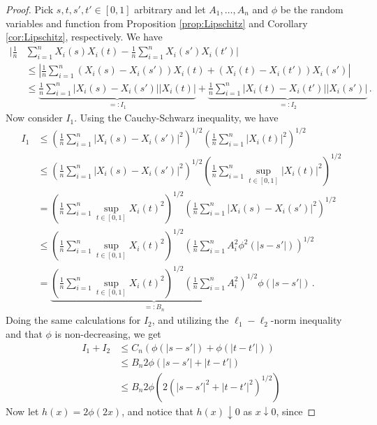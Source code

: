 \begin{proof}
    Pick $s, t, s', t' \in [0, 1]$ arbitrary and let $A_1, \dots, A_n$ and $\phi$ be the random
    variables and function from Proposition \ref{prop:Lipschitz} and Corollary \ref{cor:Lipschitz},
    respectively. We have
    \begin{align}
        |\frac{1}{n} &\sum_{i = 1}^n X_i(s) X_i(t) - \frac{1}{n} \sum_{i = 1}^n X_i(s') X_i(t')| \\
        &\leq |\frac{1}{n} \sum_{i = 1}^n (X_i(s) - X_i(s')) X_i(t) + (X_i(t) - X_i(t')) X_i(s')| \\
        &\leq \underbrace{\frac{1}{n} \sum_{i = 1}^n |X_i(s) - X_i(s')| |X_i(t)|}_{=:I_1} +
        \underbrace{\frac{1}{n} \sum_{i = 1}^n |X_i(t) - X_i(t')| |X_i(s')|}_{=:I_2} \,.
    \end{align}
    Now consider $I_1$. Using the Cauchy-Schwarz inequality, we have
    \begin{align}
        I_1 &\leq \left(\frac{1}{n} \sum_{i = 1}^n |X_i(s) - X_i(s')|^2\right)^{1/2}
        \left(\frac{1}{n} \sum_{i = 1}^n |X_i(t)|^2\right)^{1/2} \\
        &\leq \left(\frac{1}{n} \sum_{i = 1}^n |X_i(s) - X_i(s')|^2\right)^{1/2} \left(\frac{1}{n}
        \sum_{i = 1}^n \sup_{t \in [0, 1]} |X_i(t)|^2\right)^{1/2} \\
        &= \left(\frac{1}{n} \sum_{i = 1}^n \sup_{t \in [0, 1]} X_i(t)^2\right)^{1/2}
        \left(\frac{1}{n}\sum_{i = 1}^n |X_i(s) - X_i(s')|^2\right)^{1/2} \\
        &\leq \left(\frac{1}{n} \sum_{i = 1}^n \sup_{t \in [0, 1]} X_i(t)^2\right)^{1/2}
        \left(\frac{1}{n}\sum_{i = 1}^n A_i^2 \phi^2(|s - s'|)\right)^{1/2} \\
        &= \underbrace{\left(\frac{1}{n} \sum_{i = 1}^n \sup_{t \in [0, 1]} X_i(t)^2\right)^{1/2}
        \left(\frac{1}{n}\sum_{i = 1}^n A_i^2 \right)^{1/2}}_{=:B_n} \phi(|s - s'|) \,.
    \end{align}
    Doing the same calculations for $I_2$, and utilizing the $\ell_1-\ell_2$-norm inequality and
    that $\phi$ is non-decreasing, we get
    \begin{align}
        I_1 + I_2 &\leq C_n \left(\phi(|s - s'|) + \phi(|t - t'|)\right) \\
        &\leq B_n 2 \phi(|s - s'| + |t - t'|) \\
        &\leq B_n 2 \phi\left(2(|s - s'|^2 + |t - t'|^2)^{1/2}\right)
    \end{align}
    Now let $h(x) = 2 \phi(2 x)$, and notice that $h(x) \downarrow 0$ as $x \downarrow 0$, since

\end{proof}
